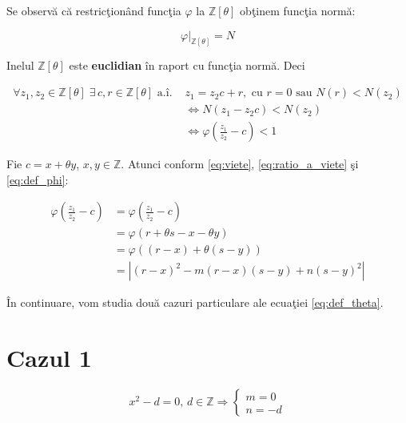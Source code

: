 \documentclass[12pt]{article}
\begin{document}
Se observă că restricţionând funcţia $\varphi$ la $\mathbb{Z}[\theta]$ obţinem funcţia normă:

\begin{equation} \label{eq:phi_restricted_z}
    \left.\varphi\right|_{\mathbb{Z}[\theta]} = N
\end{equation}

Inelul $\mathbb{Z}[\theta]$ este \textbf{euclidian} în raport cu funcţia normă. Deci

\begin{equation} \label{eq:z_theta_euclidean}
    \begin{split}
	\forall z_1, z_2 \in \mathbb{Z}[\theta] \; \exists \, c, r \in \mathbb{Z}[\theta] \text{ a.î. }
        & z_1 = z_2 c + r, \text{ cu } r = 0 \text{ sau } N(r) < N(z_2) \\
        &\Leftrightarrow N(z_1 - z_2 c) < N(z_2) \\
        &\Leftrightarrow \varphi \left(\frac{z_1}{z_2} - c\right) < 1
    \end{split}
\end{equation}

Fie $c = x + \theta y$, $x, y \in \mathbb{Z}$.
Atunci conform \eqref{eq:viete}, \eqref{eq:ratio_a_viete} şi \eqref{eq:def_phi}:

\begin{equation} \label{eq:phi_condition}
\begin{split}
    \varphi  \left(\frac{z_1}{z_2} - c\right) & =\varphi  \left(\frac{z_1}{z_2} - c\right) \\
    &=\varphi(r + \theta s - x - \theta y) \\
    &= \varphi \left( (r-x) + \theta(s-y) \right) \\
    &=  \left| (r-x)^2 - m(r-x)(s-y) + n(s-y)^2\right|
\end{split}
\end{equation}

În continuare, vom studia două cazuri particulare ale ecuaţiei \eqref{eq:def_theta}.

\section*{Cazul 1} 
\begin{equation} \label{eq:case_1}
    x^2 - d = 0, \, d \in \mathbb{Z} \Rightarrow \begin{cases} m = 0 \\ n = -d \end{cases}
\end{equation}
\end{document}
